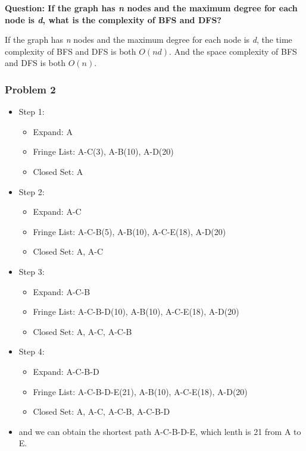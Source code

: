\documentclass[aps,letterpaper,10pt]{revtex4}
\begin{document}
\textbf{Question: If the graph has \emph{n} nodes and the maximum degree for each node is \emph{d}, what is the complexity of BFS and DFS?}

If the graph has \emph{n} nodes and the maximum degree for each node is \emph{d}, the time complexity of BFS and DFS is both $ O(nd) $. And 
the space complexity of BFS and DFS is both $ O(n) $.


\newpage

\subsubsection{Problem 2}
\begin{itemize}
	\item Step 1: 
				\begin{itemize}
					\item Expand: A
					\item Fringe List: A-C(3), A-B(10), A-D(20)
					\item Closed Set: A
				\end{itemize}
	\item Step 2: 
		 		\begin{itemize}
					\item Expand: A-C
					\item Fringe List: A-C-B(5), A-B(10), A-C-E(18), A-D(20)
					\item Closed Set: A, A-C
				\end{itemize}
	\item Step 3: 
				\begin{itemize}
				   \item Expand: A-C-B
				   \item Fringe List: A-C-B-D(10), A-B(10), A-C-E(18), A-D(20)
				   \item Closed Set: A, A-C, A-C-B
			   \end{itemize}
	\item Step 4: 
			   \begin{itemize}
				  \item Expand: A-C-B-D
				  \item Fringe List: A-C-B-D-E(21), A-B(10), A-C-E(18), A-D(20)
				  \item Closed Set: A, A-C, A-C-B, A-C-B-D
			  \end{itemize}

	\item and we can obtain the shortest path A-C-B-D-E, which lenth is 21 from A to E.
\end{itemize}
\end{document}

